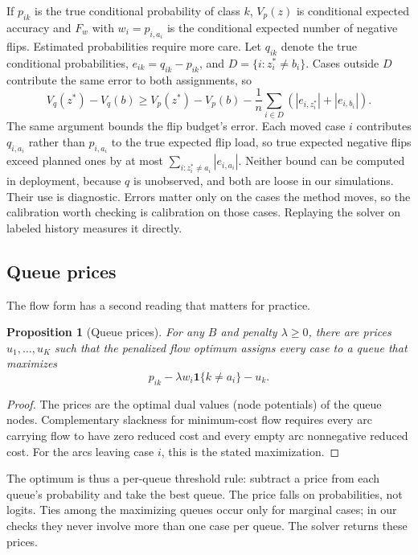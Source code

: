 \documentclass[11pt]{article}
\newtheorem{proposition}{Proposition}
\newcommand{\valuefn}{V}
\begin{document}
If $p_{ik}$ is the true conditional probability of class $k$, $\valuefn_p(z)$ is conditional
expected accuracy and $F_w$ with $w_i=p_{i,a_i}$ is the conditional expected number of negative
flips. Estimated probabilities require more care. Let $q_{ik}$ denote the true conditional
probabilities, $e_{ik}=q_{ik}-p_{ik}$, and $D=\{i:z^*_i\neq b_i\}$. Cases outside $D$ contribute
the same error to both assignments, so
\begin{equation}
  \valuefn_q(z^*)-\valuefn_q(b)
  \geq \valuefn_p(z^*)-\valuefn_p(b)
  -\frac{1}{n}\sum_{i\in D}
  \left(|e_{i,z_i^*}|+|e_{i,b_i}|\right).
  \label{eq:error-bound}
\end{equation}
The same argument bounds the flip budget's error. Each moved case $i$ contributes $q_{i,a_i}$
rather than $p_{i,a_i}$ to the true expected flip load, so true expected negative flips exceed
planned ones by at most $\sum_{i:z^*_i\neq a_i}|e_{i,a_i}|$. Neither bound can be computed in
deployment, because $q$ is unobserved, and both are loose in our simulations. Their use is
diagnostic. Errors matter only on the cases the method moves, so the calibration worth checking
is calibration on those cases. Replaying the solver on labeled history measures it directly.

\subsection{Queue prices}

The flow form has a second reading that matters for practice.

\begin{proposition}[Queue prices]
For any $B$ and penalty $\lambda\ge 0$, there are prices $u_1,\ldots,u_K$ such that the
penalized flow optimum assigns every case to a queue that maximizes
\[
  p_{ik}-\lambda w_i\mathbf{1}\{k\neq a_i\}-u_k.
\]
\end{proposition}

\begin{proof}
The prices are the optimal dual values (node potentials) of the queue nodes. Complementary
slackness for minimum-cost flow requires every arc carrying flow to have zero reduced cost and
every empty arc nonnegative reduced cost. For the arcs leaving case $i$, this is the stated
maximization.
\end{proof}

The optimum is thus a per-queue threshold rule: subtract a price from each queue's probability and
take the best queue. The price falls on probabilities, not logits. Ties among the maximizing queues
occur only for marginal cases; in our checks they never involve more than one case per queue. The
solver returns these prices.
\end{document}
